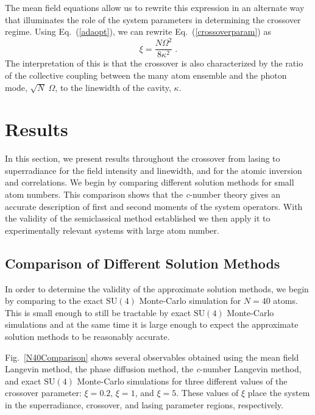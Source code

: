 \documentclass[aps,
twocolumn,
showpacs,
superscriptaddress,groupedaddress]{revtex4}
\begin{document}
The mean field equations allow us to rewrite this expression in an
alternate way that illuminates the role of the system parameters in
determining the crossover regime. Using Eq.~(\ref{adaopt}), we can
rewrite Eq.~(\ref{crossoverparam}) as
\begin{equation}
  \xi= \frac{N \Omega^2}{8\kappa^2}\;.
\label{CrossoverParameter2}
\end{equation}
The interpretation of this is that the crossover is also characterized
by the ratio of the collective coupling between the many atom ensemble
and the photon mode, $\sqrt{N}\;\Omega$, to the linewidth of the
cavity, $\kappa$.


\section{Results}
\label{sec:Results}

In this section, we present results throughout the crossover from lasing
to superradiance for the field intensity and linewidth, and for the
atomic inversion and correlations. We begin by comparing different
solution methods for small atom numbers.  This comparison shows that the
\textit{c}-number theory gives an accurate description of first and second
moments of the system operators.  With the validity of the semiclassical
method established we then apply it to experimentally relevant systems
with large atom number.


\subsection{Comparison of Different Solution Methods}

In order to determine the validity of the approximate solution methods,
we begin by comparing to the exact $\mathrm{SU}(4)$ Monte-Carlo
simulation for $N=40$ atoms. This is small enough to still be tractable
by exact $\mathrm{SU}(4)$ Monte-Carlo simulations and at the same time
it is large enough to expect the approximate solution methods to be
reasonably accurate.

Fig.~\ref{N40Comparison} shows several observables obtained using the
mean field Langevin method, the phase diffusion method, the
\textit{c}-number Langevin method, and exact $\mathrm{SU}(4)$
Monte-Carlo simulations for three different values of the crossover
parameter: $\xi=0.2$, $\xi=1$, and $\xi=5$. These values of $\xi$ place
the system in the superradiance, crossover, and lasing parameter
regions, respectively.
\end{document}
